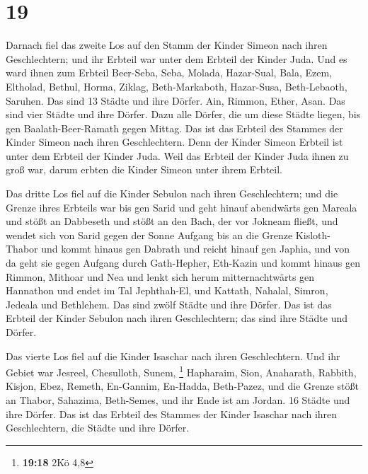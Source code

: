 \hypertarget{section-9}{%
\section{19}\label{section-9}}

 Darnach fiel das zweite Los auf den Stamm der Kinder Simeon
nach ihren Geschlechtern; und ihr Erbteil war unter dem Erbteil der
Kinder Juda.  Und es ward ihnen zum Erbteil Beer-Seba, Seba,
Molada,  Hazar-Sual, Bala, Ezem,  Eltholad,
Bethul, Horma,  Ziklag, Beth-Markaboth, Hazar-Susa,
 Beth-Lebaoth, Saruhen. Das sind 13 Städte und ihre Dörfer.
 Ain, Rimmon, Ether, Asan. Das sind vier Städte und ihre
Dörfer.  Dazu alle Dörfer, die um diese Städte liegen, bis
gen Baalath-Beer-Ramath gegen Mittag. Das ist das Erbteil des Stammes
der Kinder Simeon nach ihren Geschlechtern.  Denn der Kinder
Simeon Erbteil ist unter dem Erbteil der Kinder Juda. Weil das Erbteil
der Kinder Juda ihnen zu groß war, darum erbten die Kinder Simeon unter
ihrem Erbteil.

 Das dritte Los fiel auf die Kinder Sebulon nach ihren
Geschlechtern; und die Grenze ihres Erbteils war bis gen Sarid
 und geht hinauf abendwärts gen Mareala und stößt an
Dabbeseth und stößt an den Bach, der vor Jokneam fließt, 
und wendet sich von Sarid gegen der Sonne Aufgang bis an die Grenze
Kisloth-Thabor und kommt hinaus gen Dabrath und reicht hinauf gen
Japhia,  und von da geht sie gegen Aufgang durch
Gath-Hepher, Eth-Kazin und kommt hinaus gen Rimmon, Mithoar und Nea
 und lenkt sich herum mitternachtwärts gen Hannathon und
endet im Tal Jephthah-El,  und Kattath, Nahalal, Simron,
Jedeala und Bethlehem. Das sind zwölf Städte und ihre Dörfer.
 Das ist das Erbteil der Kinder Sebulon nach ihren
Geschlechtern; das sind ihre Städte und Dörfer.

 Das vierte Los fiel auf die Kinder Isaschar nach ihren
Geschlechtern.  Und ihr Gebiet war Jesreel, Chesulloth,
Sunem, \footnote{\textbf{19:18} 2Kö 4,8}  Hapharaim, Sion,
Anaharath,  Rabbith, Kisjon, Ebez,  Remeth,
En-Gannim, En-Hadda, Beth-Pazez,  und die Grenze stößt an
Thabor, Sahazima, Beth-Semes, und ihr Ende ist am Jordan. 16 Städte und
ihre Dörfer.  Das ist das Erbteil des Stammes der Kinder
Isaschar nach ihren Geschlechtern, die Städte und ihre Dörfer.

